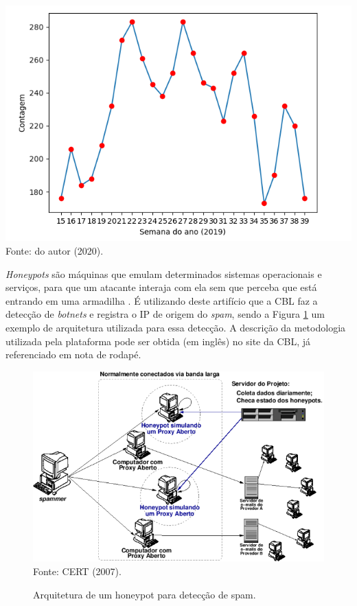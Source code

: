     \begin{grafico}[!htb]
        \centering
        \caption{Contagem de IPs do AS listados na CBL entre abril e setembro de 2019.} 
        \label{fig:plot_blacklist} 
        \includegraphics[scale=0.5]{img/plot_blacklist.png} \\
        {\small Fonte: do autor (2020).} 
    \end{grafico}
    
    \textit{Honeypots} são máquinas que emulam determinados sistemas operacionais e serviços, para que um atacante interaja com ela sem que perceba que está entrando em uma armadilha \cite{spampots2007}. É utilizando deste artifício que a CBL faz a detecção de \textit{botnets} e registra o IP de origem do \textit{spam}, sendo a Figura \ref{fig:honeypot} um exemplo de arquitetura utilizada para essa detecção. A descrição da metodologia utilizada pela plataforma pode ser obtida (em inglês) no site da CBL, já referenciado em nota de rodapé. 
    
    \begin{figure}[!htb]
        \centering
        \caption{Arquitetura de um honeypot para detecção de spam.} 
        \label{fig:honeypot} 
        \includegraphics[scale=0.8]{img/honeypot.png} \\
        {\small Fonte: CERT (2007).} 
    \end{figure}
    
